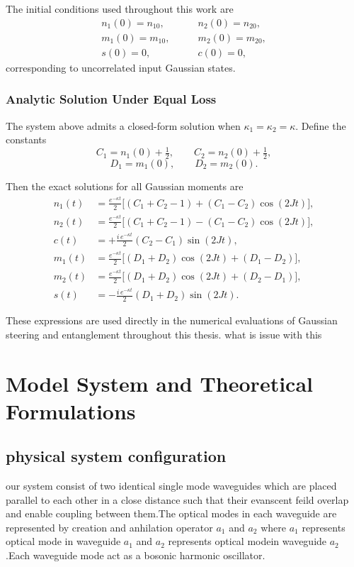 The initial conditions used throughout this work are
\[
\begin{aligned}
	n_{1}(0)=n_{10},\qquad &n_{2}(0)=n_{20},\\[4pt]
	m_{1}(0)=m_{10},\qquad &m_{2}(0)=m_{20},\\[4pt]
	s(0)=0,\qquad &c(0)=0,
\end{aligned}
\]
corresponding to uncorrelated input Gaussian states.


\subsection*{Analytic Solution Under Equal Loss}

The system above admits a closed-form solution when 
$\kappa_{1}=\kappa_{2}=\kappa$.
Define the constants
\[
C_{1}=n_{1}(0)+\tfrac12,\qquad 
C_{2}=n_{2}(0)+\tfrac12,
\]
\[
D_{1}=m_{1}(0),\qquad 
D_{2}=m_{2}(0).
\]

Then the exact solutions for all Gaussian moments are
\[
\begin{aligned}
	n_{1}(t) &= \frac{e^{-\kappa t}}{2}\Big[(C_{1}+C_{2}-1)
	+(C_{1}-C_{2})\cos(2Jt)\Big],\\[8pt]
	n_{2}(t) &= \frac{e^{-\kappa t}}{2}\Big[(C_{1}+C_{2}-1)
	-(C_{1}-C_{2})\cos(2Jt)\Big],\\[10pt]
	c(t) &= +\frac{i\,e^{-\kappa t}}{2}(C_{2}-C_{1})\sin(2Jt),\\[10pt]
	m_{1}(t) &= \frac{e^{-\kappa t}}{2}\Big[(D_{1}+D_{2})\cos(2Jt)
	+(D_{1}-D_{2})\Big],\\[8pt]
	m_{2}(t) &= \frac{e^{-\kappa t}}{2}\Big[(D_{1}+D_{2})\cos(2Jt)
	+(D_{2}-D_{1})\Big],\\[10pt]
	s(t) &= -\frac{i\,e^{-\kappa t}}{2}(D_{1}+D_{2})\sin(2Jt).
\end{aligned}
\]

These expressions are used directly in the numerical evaluations of
Gaussian steering and entanglement throughout this thesis. what is issue with this
\chapter{Model System and Theoretical Formulations}
\label{chp3}
\newpage


\section{physical system configuration}
our system consist of two identical single mode waveguides which are placed parallel to each other in a close distance  such that their evanscent feild overlap and enable coupling between them.The optical modes in each waveguide are represented by creation and anhilation operator $a_1$ and $a_2$ where $a_1$ represents optical mode in waveguide $a_1$ and $a_2$ represents optical modein waveguide $a_2$.Each waveguide mode act as  a bosonic harmonic oscillator.
